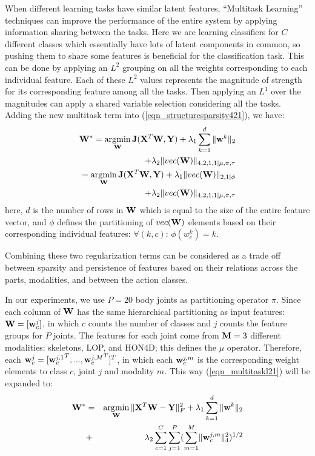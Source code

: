 \documentclass[9pt,technote,compsoc]{IEEEtran}
\begin{document}
When different learning tasks have similar latent features, ``Multitask Learning'' \cite{multitask1997} techniques can improve the performance of the entire system by applying information sharing between the tasks. Here we are learning classifiers for $C$ different classes which essentially have lots of latent components in common, so pushing them to share some features is beneficial for the classification task. This can be done by applying an $L^2$ grouping on all the weights corresponding to each individual feature. Each of these $L^2$ values represents the magnitude of strength for its corresponding feature among all the tasks. Then applying an $L^1$ over the magnitudes can apply a shared variable selection considering all the tasks. Adding the new multitask term into (\ref{eqn_structuresparsity421}), we have:
\begin{eqnarray}
\label{eqn_multitaskl1l2}{\bf W}^*=\mathop{\arg\!\min}_{\bf W}{\bf J}({\bf X}^T{\bf W},{\bf Y})+\lambda_1\sum_{k=1}^{d}\|{\bf w}^k\|_2\nonumber\\
+\lambda_2\|vec({\bf W})\|_{4,2,1,1|\mu,\pi,\tau}\\
\label{eqn_multitaskl21}=\mathop{\arg\!\min}_{\bf W}{\bf J}({\bf X}^T{\bf W},{\bf Y})+\lambda_1\|{vec(\bf W)}\|_{2,1|\phi}\nonumber\\
+\lambda_2\|vec({\bf W})\|_{4,2,1,1|\mu,\pi,\tau}
\end{eqnarray}
here, $d$ is the number of rows in $\bf W$ which is equal to the size of the entire feature vector, and $\phi$ defines the partitioning of $vec({\bf W})$ elements based on their corresponding individual features: 
$\forall (k,c):\hspace{2pt}\phi(w_c^k)=k$.

Combining these two regularization terms can be considered as a trade off between sparsity and persistence of features \cite{kowalski09sparsity} based on their relations across the parts, modalities, and between the action classes.

In our experiments, we use $P=20$ body joints as partitioning operator $\pi$. Since each column of $\bf W$ has the same hierarchical partitioning as input features: ${\bf W}=[{\bf w}_c^j]$, in which $c$ counts the number of classes and $j$ counts the feature groups for $P$ joints. The features for each joint come from ${\bf M}=3$ different modalities: skeletons, LOP, and HON4D; this defines the $\mu$ operator. Therefore, each ${\bf w}_c^j=[{{\bf w}_c^{j,1}}^T,...,{{\bf w}_c^{j,M}}^T]^T$, in which each ${{\bf w}_c^{j,m}}$ is the corresponding weight elements to class $c$, joint $j$ and modality $m$. This way (\ref{eqn_multitaskl21}) will be expanded to:
\begin{eqnarray}
\label{eqn_expanded}{\bf W}^*&=&\mathop{\arg\!\min}_{\bf W}\|{\bf X}^T{\bf W}-{\bf Y}\|_F^2+\lambda_1\sum_{k=1}^{d}\|{\bf w}^k\|_2\nonumber\\
&+&\lambda_2\sum_{c=1}^{C}\sum_{j=1}^{P}({{\sum_{m=1}^{M}}\|{\bf w}_c^{j,m}\|_{4}^2})^{1/2}
\end{eqnarray}
\end{document}
